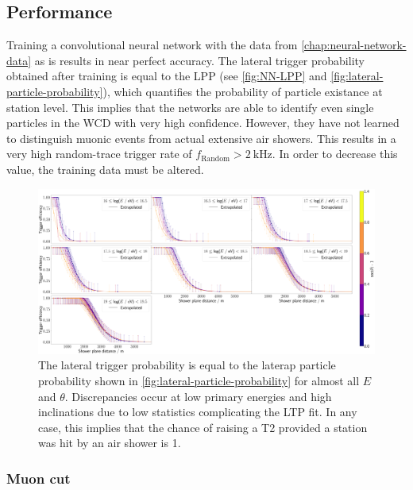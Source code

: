 \subsection{Performance}

Training a convolutional neural network with the data from \autoref{chap:neural-network-data} as is results in near perfect accuracy. The lateral trigger 
probability obtained after training is equal to the LPP (see \autoref{fig:NN-LPP} and \autoref{fig:lateral-particle-probability}), which quantifies the probability
of particle existance at station level. This implies that the networks are able to identify even single particles in the WCD with very high confidence. However, 
they have not learned to distinguish muonic events from actual extensive air showers. This results in a very high random-trace trigger rate of 
$f_\text{Random} > \SI{2}{\kilo\hertz}$. In order to decrease this value, the training data must be altered.

\begin{figure}
	\centering
	\includegraphics[width=1\textwidth]{./plots/ideal_classifier_LTP.png}
	\caption{The lateral trigger probability is equal to the laterap particle probability shown in \autoref{fig:lateral-particle-probability} for almost all 
	$E$ and $\theta$. Discrepancies occur at low primary energies and high inclinations due to low statistics complicating the LTP fit. In any case, this implies 
	that the chance of raising a T2 provided a station was hit by an air shower is 1.}
	\label{fig:NN-LPP}
\end{figure}

\subsubsection{Muon cut}

